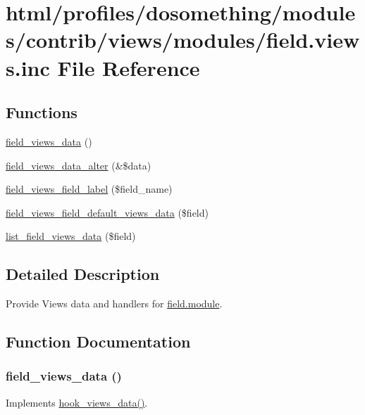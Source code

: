 \hypertarget{field_8views_8inc}{
\section{html/profiles/dosomething/modules/contrib/views/modules/field.views.inc File Reference}
\label{field_8views_8inc}
}
\subsection*{Functions}
\begin{DoxyCompactItemize}
\item 
\hyperlink{field_8views_8inc_ad5dcedc92c92554f7a7fa83805b58026}{field\_\-views\_\-data} ()
\item 
\hyperlink{field_8views_8inc_a08484225a12bde8e9e4a23c519ff4fd8}{field\_\-views\_\-data\_\-alter} (\&\$data)
\item 
\hyperlink{field_8views_8inc_a37ebb9b2c6dcf5c93062f4f96c6c1f0f}{field\_\-views\_\-field\_\-label} (\$field\_\-name)
\item 
\hyperlink{field_8views_8inc_adbb71dc4cb1642151e243f305ba34223}{field\_\-views\_\-field\_\-default\_\-views\_\-data} (\$field)
\item 
\hyperlink{field_8views_8inc_afb67c64115540e28d7e1b8ddaa3a5569}{list\_\-field\_\-views\_\-data} (\$field)
\end{DoxyCompactItemize}


\subsection{Detailed Description}
Provide Views data and handlers for \hyperlink{field_8module}{field.module}. 

\subsection{Function Documentation}
\hypertarget{field_8views_8inc_ad5dcedc92c92554f7a7fa83805b58026}{
\subsubsection[{field\_\-views\_\-data}]{\setlength{\rightskip}{0pt plus 5cm}field\_\-views\_\-data ()}}
\label{field_8views_8inc_ad5dcedc92c92554f7a7fa83805b58026}
Implements \hyperlink{group__views__hooks_ga227057901681e4a33e33c199c7a8c989}{hook\_\-views\_\-data()}.

